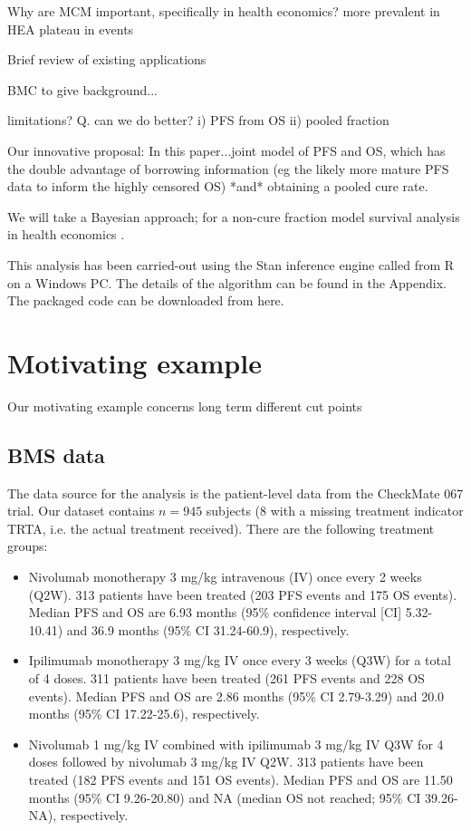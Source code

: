 \documentclass[AMA,STIX1COL]{WileyNJD-v2}
\begin{document}
Why are MCM important, specifically in health economics?
more prevalent in HEA
plateau in events

Brief review of existing applications


BMC to give background...

limitations?
Q. can we do better?
i) PFS from OS
ii) pooled fraction

Our innovative proposal:
In this paper...joint model of PFS and OS, which has the double advantage of borrowing information
(eg the likely more mature PFS data to inform the highly censored OS)
*and* obtaining a pooled cure rate.

We will take a Bayesian approach; for a non-cure fraction model survival analysis in health economics \cite{Demiris2006,Jackson2010}.

This analysis has been carried-out using the Stan inference engine
\cite{carpenter2017stan} called from R on a Windows PC.
The details of the algorithm can be found in the Appendix.
The packaged code can be downloaded from here.


\section{Motivating example}\label{sec:example}
Our motivating example concerns
long term
different cut points

\subsection{BMS data}

The data source for the analysis is the patient-level data from the CheckMate 067 trial. Our dataset contains $n=945$ subjects (8 with a missing treatment indicator TRTA, i.e. the actual treatment received). There are the following treatment groups:
\begin{itemize}
\item Nivolumab monotherapy 3 mg/kg intravenous (IV) once every 2 weeks (Q2W). 313 patients have been treated (203 PFS events and 175 OS events). Median PFS and OS are 6.93 months (95\% confidence interval [CI] 5.32-10.41) and 36.9 months (95\% CI 31.24-60.9), respectively. 
\item Ipilimumab monotherapy 3 mg/kg IV once every 3 weeks (Q3W) for a total of 4 doses. 311 patients have been treated (261 PFS events and 228 OS events). Median PFS and OS are 2.86 months (95\% CI 2.79-3.29) and 20.0 months (95\% CI 17.22-25.6), respectively.
\item Nivolumab 1 mg/kg IV combined with ipilimumab 3 mg/kg IV Q3W for 4 doses followed by nivolumab 3 mg/kg IV Q2W. 313 patients have been treated (182 PFS events and 151 OS events). Median PFS and OS are 11.50 months (95\% CI 9.26-20.80) and NA (median OS not reached; 95\% CI 39.26-NA), respectively. 
\end{itemize}
\end{document}
